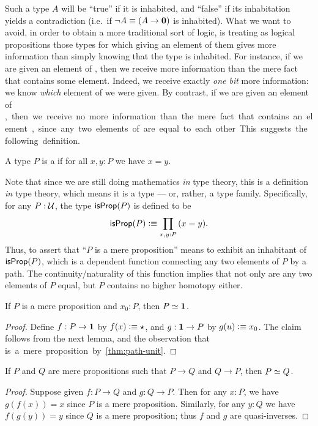 Such a type $A$ will be ``true'' if it is inhabited, and ``false'' if its inhabitation yields a contradiction (i.e.\ if $\neg A \equiv (A\to\mathbf{0})$ is inhabited).
%
What we want to avoid, in order to obtain a more traditional sort of logic, is treating as logical propositions those types for which giving an element of them gives more information than simply knowing that the type is inhabited.
For instance, if we are given an element of \bool, then we receive more information than the mere fact that \bool contains some element.
Indeed, we receive exactly \emph{one bit}
%
more information: we know \emph{which} element of \bool we were given.
By contrast, if we are given an element of \unit, then we receive no more information than the mere fact that \unit contains an element, since any two elements of \unit are equal to each other.
This suggests the following definition.

\begin{defn}\label{defn:isprop}
  A type $P$ is a 
  if for all $x,y:P$ we have $x=y$.
\end{defn}

Note that since we are still doing mathematics \emph{in} type theory, this is a definition \emph{in} type theory, which means it is a type --- or, rather, a type family.
Specifically, for any $P:\mathcal{U}$, the type $\mathsf{isProp}(P)$ is defined to be
\[ \isprop(P) \defeq \prd{x,y:P} (x=y). \]
Thus, to assert that ``$P$ is a mere proposition'' means to exhibit an inhabitant of $\mathsf{isProp}(P)$, which is a dependent function connecting any two elements of $P$ by a path.
The continuity/naturality of this function implies that not only are any two elements of $P$ equal, but $P$ contains no higher homotopy either.

\begin{lem}\label{thm:inhabprop-eqvunit}
  If $P$ is a mere proposition and $x_0:P$, then $P \simeq \mathbf{1}$.
\end{lem}
\begin{proof}
  Define $f:P\to\mathbf{1}$ by $f(x)\vcentcolon\equiv \star$, and $g:\mathbf{1}\to P$ by $g(u)\vcentcolon\equiv x_0$.
  The claim follows from the next lemma, and the observation that \unit is a mere proposition by \autoref{thm:path-unit}.
\end{proof}

\begin{lem}\label{lem:equiv-iff-hprop}
  If $P$ and $Q$ are mere propositions such that $P\to Q$ and $Q\to P$, then $P \simeq Q$.
\end{lem}
\begin{proof}
  Suppose given $f:P\to Q$ and $g:Q\to P$.
  Then for any $x:P$, we have $g(f(x))=x$ since $P$ is a mere proposition.
  Similarly, for any $y:Q$ we have $f(g(y))=y$ since $Q$ is a mere proposition; thus $f$ and $g$ are quasi-inverses.
\end{proof}

